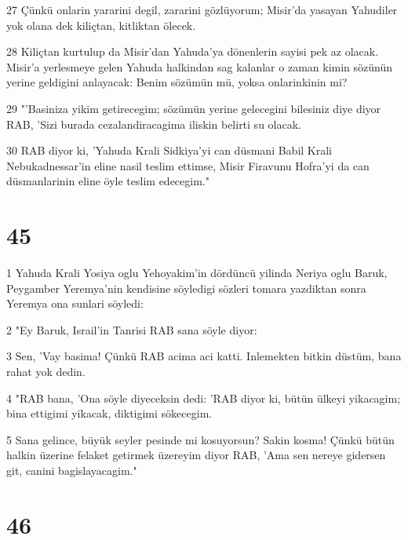 \par 27 Çünkü onlarin yararini degil, zararini gözlüyorum; Misir'da yasayan Yahudiler yok olana dek kiliçtan, kitliktan ölecek.
\par 28 Kiliçtan kurtulup da Misir'dan Yahuda'ya dönenlerin sayisi pek az olacak. Misir'a yerlesmeye gelen Yahuda halkindan sag kalanlar o zaman kimin sözünün yerine geldigini anlayacak: Benim sözümün mü, yoksa onlarinkinin mi?
\par 29 "'Basiniza yikim getirecegim; sözümün yerine gelecegini bilesiniz diye diyor RAB, 'Sizi burada cezalandiracagima iliskin belirti su olacak.
\par 30 RAB diyor ki, 'Yahuda Krali Sidkiya'yi can düsmani Babil Krali Nebukadnessar'in eline nasil teslim ettimse, Misir Firavunu Hofra'yi da can düsmanlarinin eline öyle teslim edecegim."

\chapter{45}

\par 1 Yahuda Krali Yosiya oglu Yehoyakim'in dördüncü yilinda Neriya oglu Baruk, Peygamber Yeremya'nin kendisine söyledigi sözleri tomara yazdiktan sonra Yeremya ona sunlari söyledi:
\par 2 "Ey Baruk, Israil'in Tanrisi RAB sana söyle diyor:
\par 3 Sen, 'Vay basima! Çünkü RAB acima aci katti. Inlemekten bitkin düstüm, bana rahat yok dedin.
\par 4 "RAB bana, 'Ona söyle diyeceksin dedi: 'RAB diyor ki, bütün ülkeyi yikacagim; bina ettigimi yikacak, diktigimi sökecegim.
\par 5 Sana gelince, büyük seyler pesinde mi kosuyorsun? Sakin kosma! Çünkü bütün halkin üzerine felaket getirmek üzereyim diyor RAB, 'Ama sen nereye gidersen git, canini bagislayacagim."

\chapter{46}

